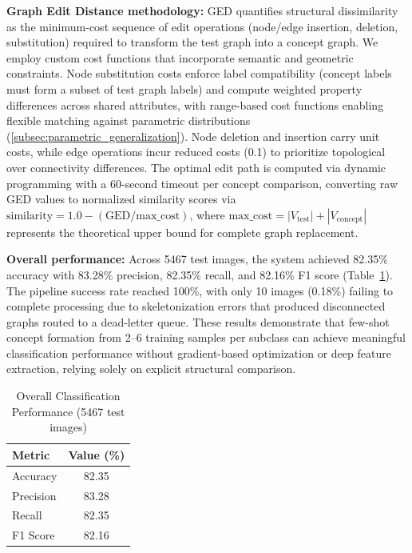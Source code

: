 \documentclass[runningheads]{llncs}
\begin{document}
\textbf{Graph Edit Distance methodology:} GED quantifies structural dissimilarity as the minimum-cost sequence of edit operations (node/edge insertion, deletion, substitution) required to transform the test graph into a concept graph. We employ custom cost functions that incorporate semantic and geometric constraints. Node substitution costs enforce label compatibility (concept labels must form a subset of test graph labels) and compute weighted property differences across shared attributes, with range-based cost functions enabling flexible matching against parametric distributions (\autoref{subsec:parametric_generalization}). Node deletion and insertion carry unit costs, while edge operations incur reduced costs (0.1) to prioritize topological over connectivity differences. The optimal edit path is computed via dynamic programming with a 60-second timeout per concept comparison, converting raw GED values to normalized similarity scores via $\text{similarity} = 1.0 - (\text{GED} / \text{max\_cost})$, where $\text{max\_cost} = |V_{\text{test}}| + |V_{\text{concept}}|$ represents the theoretical upper bound for complete graph replacement.

\textbf{Overall performance:} Across 5467 test images, the system achieved 82.35\% accuracy with 83.28\% precision, 82.35\% recall, and 82.16\% F1 score (Table~\ref{tab:overall_metrics}). The pipeline success rate reached 100\%, with only 10 images (0.18\%) failing to complete processing due to skeletonization errors that produced disconnected graphs routed to a dead-letter queue. These results demonstrate that few-shot concept formation from 2--6 training samples per subclass can achieve meaningful classification performance without gradient-based optimization or deep feature extraction, relying solely on explicit structural comparison.

\begin{table}[!t]
\caption{Overall Classification Performance (5467 test images)}
\label{tab:overall_metrics}
\centering
\begin{tabular}{lc}
\hline
\textbf{Metric} & \textbf{Value (\%)} \\
\hline
Accuracy & 82.35 \\
Precision & 83.28 \\
Recall & 82.35 \\
F1 Score & 82.16 \\
\hline
\end{tabular}
\end{table}
\end{document}
